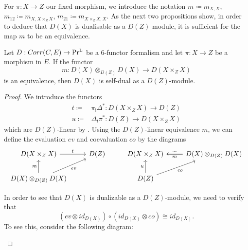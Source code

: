For  $\pi : X \to Z$ our fixed morphism, we introduce the notation $m \coloneq m_{X,X}$, $m_{12} \coloneq m_{X,X\times_Z X}$, $m_{21}\coloneq m_{X\times_Z X,X}$. As the next two propositions show, in order to deduce that $D(X)$ is dualisable as a $D(Z)$-module, it is sufficient for the map $m$ to be an equivalence.   
\begin{proposition}\label{magicmonsterdiagram proposition}
Let $D : Corr(C,E) \to \operatorname{Pr^{L}}$ be a $6$-functor formalism  and let $\pi: X \to Z$ be a morphism in $E$. If the functor 
 \[
 m: D(X)\otimes_{D(Z)}D(X) \to D(X\times_Z X)
 \]
 is an equivalence, then $D(X)$ is self-dual as a $D(Z)$-module.
\end{proposition}
 \begin{proof}
 We introduce the functors
 \begin{align*}
 t \coloneq & \pi_! \Delta^* : D(X\times_Z X) \to D(Z) \\
 u \coloneq & \Delta_! \pi^* : D(Z) \to D(X \times_Z X)
 \end{align*}
 which are $D(Z)$-linear by . Using the $D(Z)$-linear equivalence  $m$, we can define the evaluation $ev$ and coevaluation $co$ by the diagrams 
\[\begin{tikzcd}
	{D(X\times_Z X)} & {D(Z)} & {D(X\times_Z X)} & {D(X)\otimes_{D(Z)}D(X)} \\
	{D(X)\otimes_{D(Z)}D(X)} && {D(Z)}
	\arrow["t", from=1-1, to=1-2]
	\arrow["m", from=2-1, to=1-1]
	\arrow["ev"', from=2-1, to=1-2]
	\arrow["u", from=2-3, to=1-3]
	\arrow["\sim"', from=1-4, to=1-3]
	\arrow["m", from=1-4, to=1-3]
	\arrow["co"', from=2-3, to=1-4]
\end{tikzcd}\]

\noindent  In order to see that $D(X)$ is dualizable as a $D(Z)$-module, we need to verify that 
 \[
 (ev\otimes id_{D(X)})\circ (id_{D(X)} \otimes co) \cong id_{D(X)}.
 \]
 To see this, consider the following diagram: 
\begin{figure*}[h]


\end{figure*}
\end{proof}
